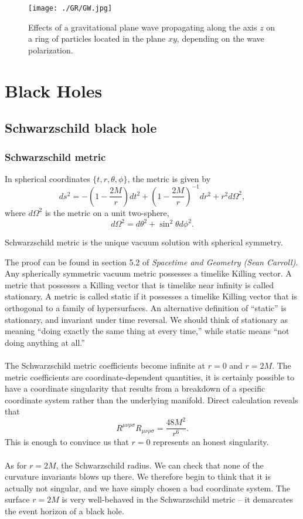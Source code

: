 \begin{figure}[!h]
\centering
\texttt{[image: ./GR/GW.jpg]}
\caption{Effects of a gravitational plane wave propagating along the axis $z$ on a ring of particles located in the plane $xy$, depending on the wave polarization.}
\end{figure}

\chapter{Black Holes}
\section{Schwarzschild black hole}
\subsection{Schwarzschild metric}
In spherical coordinates $\{t,r,\theta,\phi\}$, the metric is given by
\[ds^2 = -\left(1 - \frac{2M}{r} \right)dt^2 + \left(1 - \frac{2M}{r} \right)^{-1}dr^2 + r^2 d\Omega^2,\]
where $d\Omega^2$ is the metric on a unit two-sphere,
\[d\Omega^2 = d\theta^2 + \sin^2\theta d\phi^2.\]

\begin{newthem}
Schwarzschild metric is the unique vacuum solution with spherical symmetry.
\end{newthem}
\noindent
The proof can be found in section 5.2 of \emph{Spacetime and Geometry (Sean Carroll)}. 
Any spherically symmetric vacuum metric possesses a timelike Killing vector. A metric that possesses a Killing vector that is timelike near infinity is called stationary. A metric is called static if it possesses a timelike Killing vector that is orthogonal to a family of hypersurfaces. 
An alternative definition of ``static'' is stationary, and invariant under time reversal. We should think of stationary as meaning ``doing exactly the same thing at every time,'' while static means ``not doing anything at all.''
\\ \\
The Schwarzschild metric coefficients become infinite at $r = 0$ and $r = 2M$. 
The metric coefficients are coordinate-dependent quantities, it is certainly possible to have a coordinate singularity that results from a breakdown of a specific coordinate system rather than the underlying manifold. 
Direct calculation reveals that
\[R^{\mu\nu\rho\sigma}R_{\mu\nu\rho\sigma} = \frac{48M^2}{r^6}.\]
This is enough to convince us that $r = 0$ represents an honest singularity.
\\ \\
As for $r = 2M$, the Schwarzschild radius. We can check that none of the curvature invariants blows up there. We therefore begin to think that it is actually not singular, and we have simply chosen a bad coordinate system. The surface $r = 2M$ is very well-behaved in the Schwarzschild metric -- it demarcates the event horizon of a black hole.


